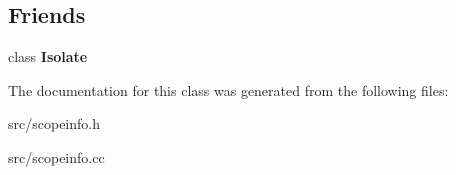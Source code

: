 \subsection*{Friends}
\begin{DoxyCompactItemize}
\item 
\hypertarget{classv8_1_1internal_1_1_context_slot_cache_aba4f0964bdacf2bbf62cf876e5d28d0a}{}class {\bfseries Isolate}\label{classv8_1_1internal_1_1_context_slot_cache_aba4f0964bdacf2bbf62cf876e5d28d0a}

\end{DoxyCompactItemize}


The documentation for this class was generated from the following files\+:\begin{DoxyCompactItemize}
\item 
src/scopeinfo.\+h\item 
src/scopeinfo.\+cc\end{DoxyCompactItemize}
